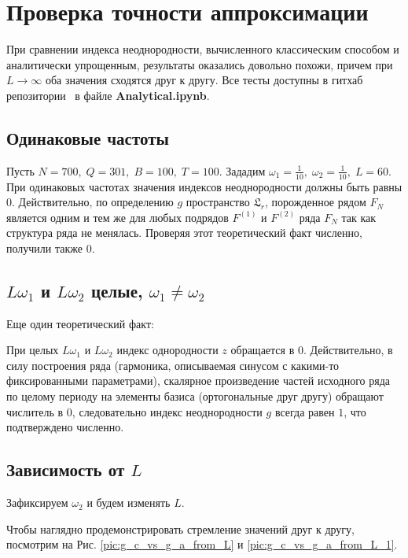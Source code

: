 \documentclass[specialist, substylefile = spbu.rtx,
			   subf, href, 12pt]{disser}
\begin{document}
\section{Проверка точности аппроксимации}
При сравнении индекса неоднородности, вычисленного классическим способом и аналитически упрощенным, результаты оказались довольно похожи, причем при $L \rightarrow \infty $ оба значения сходятся друг к другу. Все тесты доступны в гитхаб репозитории~\cite{Kononykhin2022} в файле \textbf{Analytical.ipynb}.



\subsection{Одинаковые частоты}
Пусть $ N = 700,\; Q = 301,\; B = 100,\; T = 100 $. 
Зададим $\omega_1 = \frac{1}{10},\; \omega_2 = \frac{1}{10},\; L = 60$. При одинаковых частотах значения индексов неоднородности должны быть равны $ 0 $. Действительно, по определению $ g $ пространство $ \mathfrak{L}_r $, порожденное рядом $ F_N $ является одним и тем же для любых подрядов $ F^{(1)} $ и $ F^{(2)} $ ряда $ F_N $ так как структура ряда не менялась.
Проверяя этот теоретический факт численно, получили также $ 0 $.

\subsection{$L\omega_1$ и $L\omega_2 $ целые, $\omega_1 \neq \omega_2 $}
Еще один теоретический факт: 

При целых $L\omega_1$ и $L\omega_2 $ индекс однородности $ z $ обращается в 0. Действительно, в силу построения ряда (гармоника, описываемая синусом с какими-то фиксированными параметрами), скалярное произведение частей исходного ряда по целому периоду на элементы базиса (ортогональные друг другу) обращают числитель в 0, следовательно индекс неоднородности $ g $ всегда равен $ 1 $, что подтверждено численно.


\subsection{Зависимость от $ L $}

Зафиксируем $ \omega_2 $ и будем изменять $ L $. 

Чтобы наглядно продемонстрировать стремление значений друг к другу, посмотрим на Рис. \ref{pic:g_c_vs_g_a_from_L} и \ref{pic:g_c_vs_g_a_from_L_1}.
\end{document}
